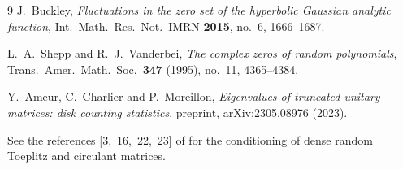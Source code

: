 \documentclass[11pt]{article}
\begin{document}
\begin{thebibliography}{9}
J.~Buckley,
\emph{Fluctuations in the zero set of the hyperbolic Gaussian analytic
function},
Int.\ Math.\ Res.\ Not.\ IMRN \textbf{2015}, no.~6, 1666--1687.

L.~A.~Shepp and R.~J.~Vanderbei,
\emph{The complex zeros of random polynomials},
Trans.\ Amer.\ Math.\ Soc.\ \textbf{347} (1995), no.~11, 4365--4384.

Y.~Ameur, C.~Charlier and P.~Moreillon,
\emph{Eigenvalues of truncated unitary matrices: disk counting statistics},
preprint, arXiv:2305.08976 (2023).

See the references [3,~16,~22,~23] of \cite{Manrique} for the conditioning of
dense random Toeplitz and circulant matrices.

\end{thebibliography}
\end{document}
